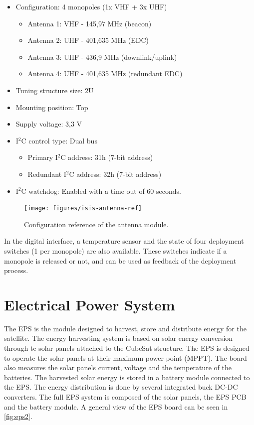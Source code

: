 \begin{itemize}
    \item Configuration: 4 monopoles (1x VHF + 3x UHF)
        \begin{itemize}
            \item Antenna 1: VHF - 145,97 MHz (beacon)
            \item Antenna 2: UHF - 401,635 MHz (EDC)
            \item Antenna 3: UHF - 436,9 MHz (downlink/uplink)
            \item Antenna 4: UHF - 401,635 MHz (redundant EDC)
        \end{itemize}
    \item Tuning structure size: 2U
    \item Mounting position: Top
    \item Supply voltage: 3,3 V
    \item I$^{2}$C control type: Dual bus
        \begin{itemize}
            \item Primary I$^{2}$C address: 31h (7-bit address)
            \item Redundant I$^{2}$C address: 32h (7-bit address)
        \end{itemize}
    \item I$^{2}$C watchdog: Enabled with a time out of 60 seconds.
\end{itemize}

\begin{figure}[!ht]
    \begin{center}
        \texttt{[image: figures/isis-antenna-ref]}
        \caption{Configuration reference of the antenna module.}
        \label{fig:isis-antenna-ref}
    \end{center}
\end{figure}

In the digital interface, a temperature sensor and the state of four deployment switches (1 per monopole) are also available. These switches indicate if a monopole is released or not, and can be used as feedback of the deployment process.

\section{Electrical Power System}

The EPS is the module designed to harvest, store and distribute energy for the satellite. The energy harvesting system is based on solar energy conversion through te solar panels attached to the CubeSat structure. The EPS is designed to operate the solar panels at their maximum power point (MPPT). The board also measures the solar panels current, voltage and the temperature of the batteries. The harvested solar energy is stored in a battery module connected to the EPS. The energy distribution is done by several integrated buck DC-DC converters. The full EPS system is composed of the solar panels, the EPS PCB and the battery module. A general view of the EPS board can be seen in \autoref{fig:eps2}.

